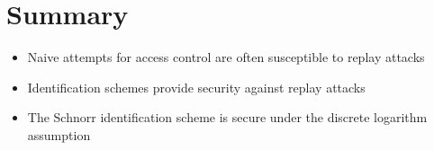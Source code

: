 \section{Summary}
    \begin{itemize}
        \item Naive attempts for access control are often susceptible to replay attacks
        \item Identification schemes provide security against replay attacks
        \item The Schnorr identification scheme is secure under the discrete logarithm assumption
    \end{itemize}


